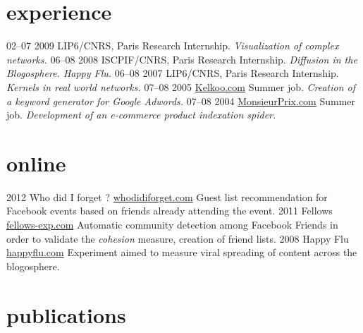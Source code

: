 \documentclass[]{friggeri-cv}
\begin{document}
\section{experience}

\begin{entrylist}
  \entry
    {02–07 2009}
    {LIP6/CNRS, Paris}
    {Research Internship.}
    {\emph{Visualization of complex networks.}}
  \entry
    {06–08 2008}
    {ISCPIF/CNRS, Paris}
    {Research Internship.}
    {\emph{Diffusion in the Blogosphere. Happy Flu.}}
  \entry
    {06–08 2007}
    {LIP6/CNRS, Paris}
    {Research Internship.}
    {\emph{Kernels in real world networks.}}
  \entry
    {07–08 2005}
    {\href{http://www.kelkoo.com}{Kelkoo.com}}
    {Summer job.}
    {\emph{Creation of a keyword generator for Google Adwords.}}
  \entry
    {07–08 2004}
    {\href{http://www.monsieurprix.com}{MonsieurPrix.com}}
    {Summer job.}
    {\emph{Development of an e-commerce product indexation spider.}}
\end{entrylist}

\section{online}

\begin{entrylist}
  \entry
    {2012}
    {Who did I forget ?}
    {\href{http://whodidiforget.com}{whodidiforget.com}}
    {Guest list recommendation for Facebook events based on friends already attending the event.}
  \entry
    {2011}
    {Fellows}
    {\href{http://fellows-exp.com}{fellows-exp.com}}
    {Automatic community detection among Facebook Friends in order to validate the \emph{cohesion} measure, creation of friend lists.}
  \entry
    {2008}
    {Happy Flu}
    {\href{http://happyflu.com}{happyflu.com}}
    {Experiment aimed to measure viral spreading of content across the blogosphere.}
\end{entrylist}

\section{publications}

\end{document}
